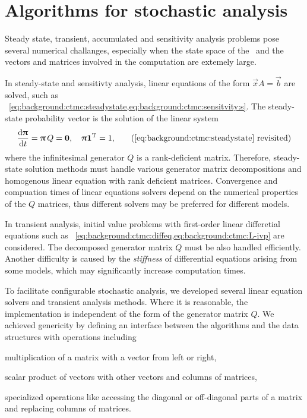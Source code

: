 \chapter{Algorithms for stochastic analysis}
\label{chap:algorithms}

Steady state, transient, accumulated and sensitivity analysis problems
pose several numerical challanges, especially when the state space of
the \CTMC\ and the vectors and matrices involved in the computation are
extemely large.

In steady-state and sensitivty analysis, linear equations of the form
$\vec{x} A = \vec{b}$ are solved, such as%
~\vref{eq:background:ctmc:steadystate,eq:background:ctmc:sensitvity:s}. The
steady-state probability vector is the solution of the linear system
\begin{equation}
  \frac{\dd \vec{\uppi}}{\dd t} = \vec{\uppi} \, Q = \vec{0},
  \quad \vec{\uppi} \vec{1}^\T = 1 \text,
  \tag{\ref{eq:background:ctmc:steadystate}~revisited}
\end{equation}
where the infinitesimal generator $Q$ is a rank-deficient
matrix. Therefore, steady-state solution methods must handle various
generator matrix decompositions and homogenous linear equation with
rank deficient matrices. Convergence and compuation times of linear
equations solvers depend on the numerical properties of the $Q$
matrices, thus different solvers may be preferred for different
models.

In transient analysis, initial value problems with first-order linear
differetial equations such as%
~\vref{eq:background:ctmc:diffeq,eq:background:ctmc:L-ivp} are
considered. The decomposed generator matrix $Q$ must be also handled
efficiently. Another difficulty is caused by the \emph{stiffness} of
differential equations arising from some models, which may
significantly increase computation times.

To facilitate configurable stochastic analysis, we developed several
linear equation solvers and transient analysis methods. Where it is
reasonable, the implementation is independent of the form of the
generator matrix $Q$. We achieved genericity by defining an interface
between the algorithms and the data structures with operations including
\begin{asparaitem}
\item multiplication of a matrix with a vector from left or right,
\item scalar product of vectors with other vectors and columns of
  matrices,
\item specialized operations like accessing the diagonal or
  off-diagonal parts of a matrix and replacing columns of matrices.
\end{asparaitem}


